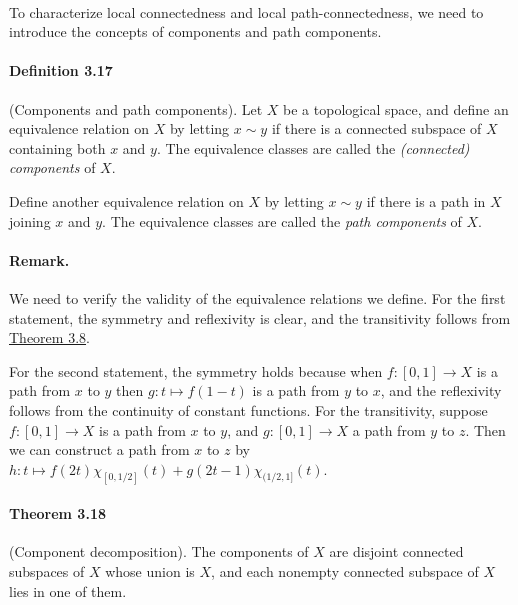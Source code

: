 \documentclass{article}
\numberwithin{equation}{section}
\theoremstyle{plain}
\theoremstyle{definition}
\begin{document}
\paragraph{} To characterize local connectedness and local path-connectedness, we need to introduce the concepts of components and path components.

\paragraph{Definition 3.17\label{def:3.17}} (Components and path components). Let $X$ be a topological space, and define an equivalence relation on $X$ by letting $x\sim y$ if there is a connected subspace of $X$ containing both $x$ and $y$. The equivalence classes are called the \textit{(connected) components} of $X$.

Define another equivalence relation on $X$ by letting $x\sim y$ if there is a path in $X$ joining $x$ and $y$. The equivalence classes are called the \textit{path components} of $X$.

\paragraph{Remark.} We need to verify the validity of the equivalence relations we define. For the first statement, the symmetry and reflexivity is clear, and the transitivity follows from \hyperref[thm:3.8]{Theorem 3.8}. 

For the second statement, the symmetry holds because when $f:[0,1]\to X$ is a path from $x$ to $y$ then $g:t\mapsto f(1-t)$ is a path from $y$ to $x$, and the reflexivity follows from the continuity of constant functions. For the transitivity, suppose $f:[0,1]\to X$ is a path from $x$ to $y$, and $g:[0,1]\to X$ a path from $y$ to $z$. Then we can construct a path from $x$ to $z$ by $h:t\mapsto f(2t)\chi_{[0,1/2]}(t) + g(2t - 1)\chi_{(1/2, 1]}(t)$.

\paragraph{Theorem 3.18\label{thm:3.18}} (Component decomposition). The components of $X$ are disjoint connected subspaces of $X$ whose union is $X$, and each nonempty connected subspace of $X$ lies in one of them.  
\end{document}
